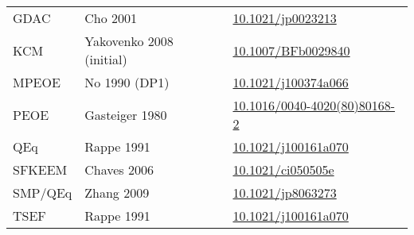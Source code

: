 \documentclass[oneside]{memoir}
\begin{document}
\begin{table}
\begin{tabular}{lll}
GDAC & Cho 2001 & \href{https://doi.org/10.1021/jp0023213}{10.1021/jp0023213}\\
KCM & Yakovenko 2008 (initial) & \href{https://doi.org/10.1007/BFb0029840}{10.1007/BFb0029840}\\
MPEOE & No 1990 (DP1) & \href{https://doi.org/10.1021/j100374a066}{10.1021/j100374a066}\\
PEOE & Gasteiger 1980 & \href{https://doi.org/10.1016/0040-4020(80)80168-2}{10.1016/0040-4020(80)80168-2}\\
QEq & Rappe 1991 & \href{https://doi.org/10.1021/j100161a070}{10.1021/j100161a070}\\
SFKEEM & Chaves 2006 & \href{https://doi.org/10.1021/ci050505e}{10.1021/ci050505e}\\
SMP/QEq & Zhang 2009 & \href{https://doi.org/10.1021/jp8063273}{10.1021/jp8063273}\\
TSEF & Rappe 1991 & \href{https://doi.org/10.1021/j100161a070}{10.1021/j100161a070}\\
\bottomrule
\end{tabular}
\end{table}
\end{document}
